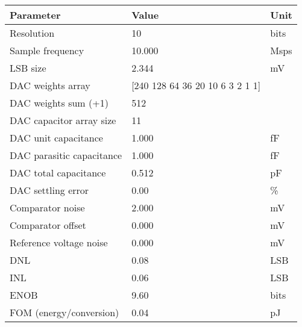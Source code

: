 \begin{tabular}{lll}
\toprule
Parameter & Value & Unit \\
\midrule
Resolution & 10 & bits \\
Sample frequency & 10.000 & Msps \\
LSB size & 2.344 & mV \\
DAC weights array & [240 128  64  36  20  10   6   3   2   1   1] &  \\
DAC weights sum (+1) & 512 &  \\
DAC capacitor array size & 11 &  \\
DAC unit capacitance & 1.000 & fF \\
DAC parasitic capacitance & 1.000 & fF \\
DAC total capacitance & 0.512 & pF \\
DAC settling error & 0.00 & \% \\
Comparator noise & 2.000 & mV \\
Comparator offset & 0.000 & mV \\
Reference voltage noise & 0.000 & mV \\
DNL & 0.08 & LSB \\
INL & 0.06 & LSB \\
ENOB & 9.60 & bits \\
FOM (energy/conversion) & 0.04 & pJ \\
\bottomrule
\end{tabular}
